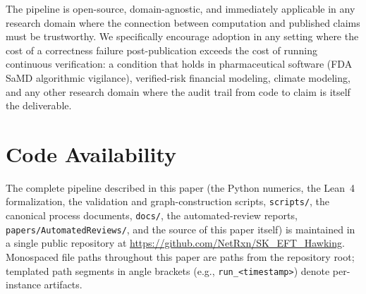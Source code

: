 \documentclass[11pt]{article}
\begin{document}
The pipeline is open-source, domain-agnostic, and immediately
applicable in any research domain where the connection between
computation and published claims must be trustworthy. We
specifically encourage adoption in any setting where the cost of a
correctness failure post-publication exceeds the cost of running
continuous verification: a condition that holds in
pharmaceutical software (FDA SaMD algorithmic vigilance),
verified-risk financial modeling, climate modeling, and any other
research domain where the audit trail from code to claim is itself
the deliverable.


\section*{Code Availability}

The complete pipeline described in this paper (the Python
numerics, the Lean~4 formalization, the validation and
graph-construction scripts, \texttt{scripts/}, the canonical
process documents, \texttt{docs/}, the automated-review reports,
\texttt{papers/AutomatedReviews/}, and the source of this paper
itself) is maintained in a single public repository at
\url{https://github.com/NetRxn/SK_EFT_Hawking}. Monospaced file
paths throughout this paper are paths from the repository root;
templated path segments in angle brackets (e.g.,
\texttt{run\_<timestamp>}) denote per-instance artifacts.

\end{document}
